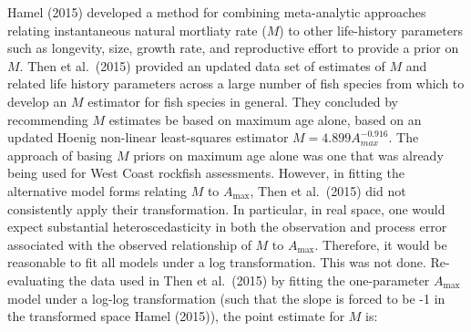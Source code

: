 \documentclass[11pt,
  english,
  a4paper,
]{article}
\begin{document}
\leavevmode\tagmcend\tagstructend


Hamel {(2015)\leavevmode\tagmcend\tagstructend} developed a method for combining meta-analytic approaches relating instantaneous natural mortliaty rate ({\(M\)\leavevmode\tagmcend\tagstructend}) to other life-history parameters such as longevity, size, growth rate, and reproductive effort to provide a prior on {\(M\)\leavevmode\tagmcend\tagstructend}. Then et al.~{(2015)\leavevmode\tagmcend\tagstructend} provided an updated data set of estimates of {\(M\)\leavevmode\tagmcend\tagstructend} and related life history parameters across a large number of fish species from which to develop an {\(M\)\leavevmode\tagmcend\tagstructend} estimator for fish species in general. They concluded by recommending {\(M\)\leavevmode\tagmcend\tagstructend} estimates be based on maximum age alone, based on an updated Hoenig non-linear least-squares estimator {\(M=4.899A^{-0.916}_{max}\)\leavevmode\tagmcend\tagstructend}. The approach of basing {\(M\)\leavevmode\tagmcend\tagstructend} priors on maximum age alone was one that was already being used for West Coast rockfish assessments. However, in fitting the alternative model forms relating {\(M\)\leavevmode\tagmcend\tagstructend} to {\(A_{\text{max}}\)\leavevmode\tagmcend\tagstructend}, Then et al.~{(2015)\leavevmode\tagmcend\tagstructend} did not consistently apply their transformation. In particular, in real space, one would expect substantial heteroscedasticity in both the observation and process error associated with the observed relationship of {\(M\)\leavevmode\tagmcend\tagstructend} to {\(A_{\text{max}}\)\leavevmode\tagmcend\tagstructend}. Therefore, it would be reasonable to fit all models under a log transformation. This was not done. Re-evaluating the data used in Then et al.~{(2015)\leavevmode\tagmcend\tagstructend} by fitting the one-parameter {\(A_{\text{max}}\)\leavevmode\tagmcend\tagstructend} model under a log-log transformation (such that the slope is forced to be -1 in the transformed space Hamel {(2015)\leavevmode\tagmcend\tagstructend}), the point estimate for {\(M\)\leavevmode\tagmcend\tagstructend} is:
\end{document}
